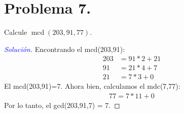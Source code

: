 \documentclass[a4paper,12pt]{article}
\newenvironment{solution}
  {\renewcommand\qedsymbol{$\square$}\begin{proof}[\textcolor{blue}{Solución}]}
  {\end{proof}}
\begin{document}
\section{Problema 7.} Calcule $\operatorname{mcd}(203,91,77)$.
\begin{solution}
	Encontrando el mcd(203,91):
	\begin{align*}
		 203 &= 91*2 + 21\\
		91 &= 21*4 + 7\\
		21 &= 7*3 + 0
	\end{align*}
El mcd(203,91)=7. Ahora bien, calculamos el mdc(7,77):
\begin{align*}
	 77 = 7*11 + 0
\end{align*}
Por lo tanto, el gcd(203,91,7) = 7.
\end{solution}



\end{document}
